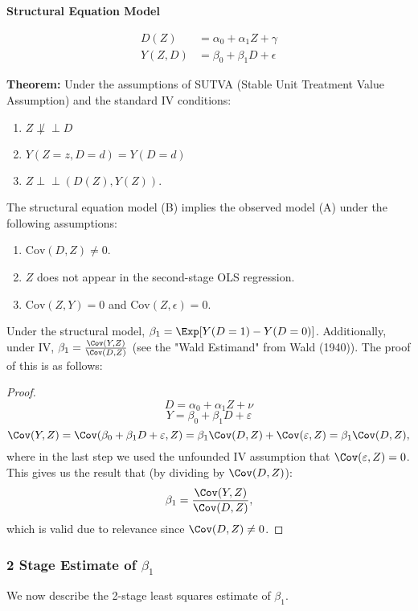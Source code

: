 \textbf{Structural Equation Model}

\begin{align*}
    D(Z) &= \alpha_0 + \alpha_1 Z + \gamma \tag{B} \\
    Y(Z, D) &= \beta_0 + \beta_1 D + \epsilon \tag{B}
\end{align*}

\textbf{Theorem:} Under the assumptions of SUTVA (Stable Unit Treatment Value Assumption) and the standard IV conditions:
\begin{enumerate}
    \item {} \(Z \not\perp\!\!\!\perp D\) 
    \item {} \(Y(Z = z, D = d) = Y(D = d)\)
    \item {} \(Z \perp\!\!\!\perp (D(Z), Y(Z))\).
\end{enumerate}

The structural equation model (B) implies the observed model (A) under the following assumptions:
\begin{enumerate}
    \item {} \(\text{Cov}(D, Z) \neq 0\).
    \item {} \(Z\) does not appear in the second-stage OLS regression.
    \item {} \(\text{Cov}(Z, Y) = 0\) and \(\text{Cov}(Z, \epsilon) = 0\).
\end{enumerate}

Under the structural model, $\beta_1 = \Exp[Y(D=1) - Y(D=0)]$. Additionally, under IV, $\beta_1 = \frac{\Cov(Y,Z)}{\Cov(D,Z)}$ (see the "Wald Estimand" from Wald (1940)). The proof of this is as follows:
\begin{proof}
$$D = \alpha_0 + \alpha_1 Z + \nu$$
$$Y = \beta_0 + \beta_1 D + \varepsilon$$
$$\Cov(Y, Z) = \Cov (\beta_0 + \beta_1 D + \varepsilon, Z) = \beta_1 \Cov(D, Z) + \Cov(\varepsilon, Z) = \beta_1 \Cov(D, Z),$$
where in the last step we used the unfounded IV assumption that $\Cov(\varepsilon, Z) = 0$. This gives us the result that (by dividing by $\Cov(D,Z)$):
$$\beta_1 = \frac{\Cov(Y,Z)}{\Cov(D,Z)},$$
which is valid due to relevance since $\Cov(D, Z) \neq 0$.
\end{proof}

\subsubsection{2 Stage Estimate of $\beta_1$}
We now describe the 2-stage least squares estimate of $\beta_1$.

